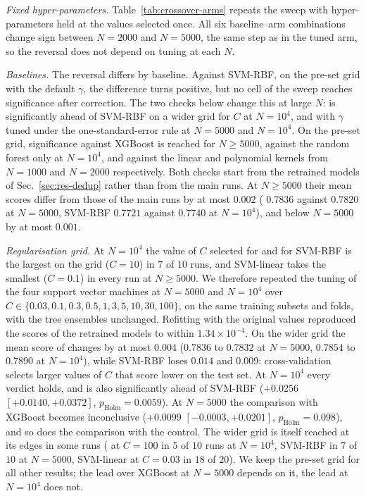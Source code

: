 \emph{Fixed hyper-parameters.} Table~\ref{tab:crossover-arms} repeats the sweep with
hyper-parameters held at the values selected once. All six baseline--arm combinations change sign
between $N=2000$ and $N=5000$, the same step as in the tuned arm, so the reversal does not depend
on tuning at each $N$.

\emph{Baselines.} The reversal differs by baseline. Against SVM-RBF, on the pre-set grid with the
default $\gamma$, the difference turns positive, but no cell of the sweep reaches significance
after correction. The two checks below change this at large $N$: \QSVM{} is significantly ahead
of SVM-RBF on a wider grid for $C$ at $N=10^4$, and with $\gamma$ tuned under the
one-standard-error rule at $N=5000$ and $N=10^4$. On the pre-set grid, significance against
XGBoost is reached for $N\geq5000$, against the random forest only at $N=10^4$, and against the
linear and polynomial kernels from $N=1000$ and $N=2000$ respectively. Both checks start from
the retrained models of Sec.~\ref{sec:res-dedup} rather than from the main runs. At $N\geq5000$
their mean scores differ from those of the main runs by at most $0.002$ (\QSVM{} $0.7836$
against $0.7820$ at $N=5000$, SVM-RBF $0.7721$ against $0.7740$ at $N=10^4$), and below
$N=5000$ by at most $0.001$.

\emph{Regularisation grid.} At $N=10^4$ the value of $C$ selected for \QSVM{} and for SVM-RBF
is the largest on the grid ($C=10$) in $7$ of $10$ runs, and SVM-linear takes the smallest
($C=0.1$) in every run at $N\geq5000$. We therefore repeated the tuning of the four support vector machines at
$N=5000$ and $N=10^4$ over $C\in\{0.03,0.1,0.3,0.5,1,3,5,10,30,100\}$, on the same training
subsets and folds, with the tree ensembles unchanged. Refitting with the original values
reproduced the scores of the retrained models to within $1.34\times10^{-4}$. On the wider grid the mean score of
\QSVM{} changes by at most $0.004$ ($0.7836$ to $0.7832$ at $N=5000$, $0.7854$ to $0.7890$ at
$N=10^4$), while SVM-RBF loses $0.014$ and $0.009$: cross-validation selects larger values of
$C$ that score lower on the test set. At $N=10^4$ every verdict holds, and \QSVM{} is also
significantly ahead of SVM-RBF ($+0.0256$ $[+0.0140,+0.0372]$, $p_{\mathrm{Holm}}=0.0059$). At
$N=5000$ the comparison with XGBoost becomes inconclusive ($+0.0099$ $[-0.0003,+0.0201]$,
$p_{\mathrm{Holm}}=0.098$), and so does the comparison with the \Zmap{} control. The wider grid
is itself reached at its edges in some runs (\QSVM{} at $C=100$ in $5$ of $10$ runs at
$N=10^4$, SVM-RBF in $7$ of $10$ at $N=5000$, SVM-linear at $C=0.03$ in $18$ of $20$). We
keep the pre-set grid for all other results; the lead over XGBoost at $N=5000$ depends on it,
the lead at $N=10^4$ does not.


